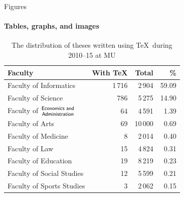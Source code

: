 \documentclass{beamer}
\begin{document}
    \begin{frame}[label=figs1]{Figures}
      \framesubtitle{Tables, graphs, and images}
      \begin{table}[!b]
        {\carlitoTLF %
        \begin{tabularx}{\textwidth}{Xrrr}
          \textbf{Faculty} & \textbf{With \TeX} & \textbf{Total} &
          \textbf{\%} \\
          \toprule
          Faculty of Informatics       & 1\,716  & 2\,904  &
          59.09 \\%
          Faculty of Science           & 786     & 5\,275  &
          14.90 \\%
          Faculty of $\genfrac{}{}{0pt}{}{\textsf{Economics and}}{%
          \textsf{Administration}}$    & 64      & 4\,591  &
          1.39  \\%
          Faculty of Arts              & 69      & 10\,000 &
          0.69  \\%
          Faculty of Medicine          & 8       & 2\,014  &
          0.40  \\%
          Faculty of Law               & 15      & 4\,824  &
          0.31  \\%
          Faculty of Education         & 19      & 8\,219  &
          0.23  \\%
          Faculty of Social Studies    & 12      & 5\,599  &
          0.21  \\%
          Faculty of Sports Studies    & 3       & 2\,062  &
          0.15  \\%
          \bottomrule
        \end{tabularx}}
        \caption{The distribution of theses written using \TeX\ during 2010--15 at MU}
      \end{table}
    \end{frame}
\end{document}
